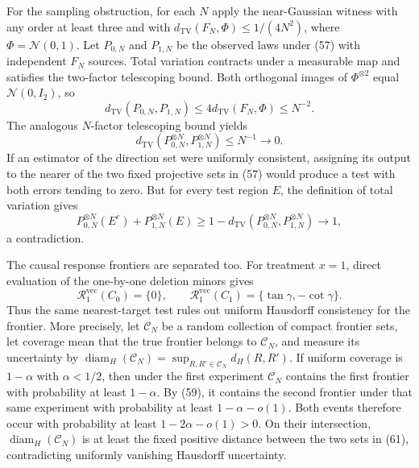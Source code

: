 For the sampling obstruction, for each \(N\) apply the near-Gaussian witness with any order at least three and with \(d_{\mathrm{TV}}(F_N,\Phi)\le1/(4N^2)\), where \(\Phi=\mathcal N(0,1)\). Let \(P_{0,N}\) and \(P_{1,N}\) be the observed laws under (57) with independent \(F_N\) sources. Total variation contracts under a measurable map and satisfies the two-factor telescoping bound. Both orthogonal images of \(\Phi^{\otimes2}\) equal \(\mathcal N(0,I_2)\), so
\[
 d_{\mathrm{TV}}(P_{0,N},P_{1,N})
 \le4d_{\mathrm{TV}}(F_N,\Phi)\le N^{-2}. \tag{58}
\]
The analogous \(N\)-factor telescoping bound yields
\[
 d_{\mathrm{TV}}(P_{0,N}^{\otimes N},P_{1,N}^{\otimes N})
 \le N^{-1}\longrightarrow0. \tag{59}
\]
If an estimator of the direction set were uniformly consistent, assigning its output to the nearer of the two fixed projective sets in (57) would produce a test with both errors tending to zero. But for every test region \(E\), the definition of total variation gives
\[
 P_{0,N}^{\otimes N}(E^c)+P_{1,N}^{\otimes N}(E)
 \ge1-d_{\mathrm{TV}}(P_{0,N}^{\otimes N},P_{1,N}^{\otimes N})\longrightarrow1, \tag{60}
\]
a contradiction.

The causal response frontiers are separated too. For treatment \(x=1\), direct evaluation of the one-by-one deletion minors gives
\[
 \mathcal R_1^{\mathrm{vec}}(C_0)=\{0\},
 \qquad
 \mathcal R_1^{\mathrm{vec}}(C_1)=\{\tan\gamma,-\cot\gamma\}. \tag{61}
\]
Thus the same nearest-target test rules out uniform Hausdorff consistency for the frontier. More precisely, let \(\mathscr C_N\) be a random collection of compact frontier sets, let coverage mean that the true frontier belongs to \(\mathscr C_N\), and measure its uncertainty by \(\operatorname{diam}_H(\mathscr C_N)=\sup_{R,R'\in\mathscr C_N}d_H(R,R')\). If uniform coverage is \(1-\alpha\) with \(\alpha<1/2\), then under the first experiment \(\mathscr C_N\) contains the first frontier with probability at least \(1-\alpha\). By (59), it contains the second frontier under that same experiment with probability at least \(1-\alpha-o(1)\). Both events therefore occur with probability at least \(1-2\alpha-o(1)>0\). On their intersection, \(\operatorname{diam}_H(\mathscr C_N)\) is at least the fixed positive distance between the two sets in (61), contradicting uniformly vanishing Hausdorff uncertainty.

